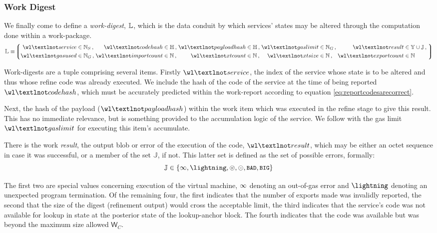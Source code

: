 \subsubsection{Work Digest}
We finally come to define a \emph{work-digest}, $\mathbb{L}$, which is the data conduit by which services' states may be altered through the computation done within a work-package.
\begin{equation}\label{eq:workdigest}
  \mathbb{L} \equiv \tuple{
    \begin{alignedat}{9}
      \isa{\wl¬service&}{\serviceid}\,,\;
      \isa{&\wl¬codehash&}{\hash}\,,\;
      \isa{&\wl¬payloadhash&}{\hash}\,,\;
      \isa{&\wl¬gaslimit&}{\gas}\,,\;
      \isa{&\wl¬result&}{\blob \cup \mathbb{J}}\,,\;\\
      \isa{\wl¬gasused&}{\gas}\,,\; %
      \isa{&\wl¬importcount&}{\N}\,,\; %
      \isa{&\wl¬xtcount&}{\N}\,,\; %
      \isa{&\wl¬xtsize&}{\N}\,,\; %
      \isa{&\wl¬exportcount&}{\N} %
    \end{alignedat}
  }
\end{equation}

Work-digests are a tuple comprising several items. Firstly $\wl¬service$, the index of the service whose state is to be altered and thus whose refine code was already executed. We include the hash of the code of the service at the time of being reported $\wl¬codehash$, which must be accurately predicted within the work-report according to equation \ref{eq:reportcodesarecorrect}.

Next, the hash of the payload ($\wl¬payloadhash$) within the work item which was executed in the refine stage to give this result. This has no immediate relevance, but is something provided to the accumulation logic of the service. We follow with the gas limit $\wl¬gaslimit$ for executing this item's accumulate.

There is the work \emph{result}, the output blob or error of the execution of the code, $\wl¬result$, which may be either an octet sequence in case it was successful, or a member of the set $\mathbb{J}$, if not. This latter set is defined as the set of possible errors, formally:
\begin{equation}
  \mathbb{J} \in \{ \oog, \panic, \badexports, \oversize, \token{BAD}, \token{BIG} \}
\end{equation}

The first two are special values concerning execution of the virtual machine, $\infty$ denoting an out-of-gas error and $\panic$ denoting an unexpected program termination. Of the remaining four, the first indicates that the number of exports made was invalidly reported, the second that the size of the digest (refinement output) would cross the acceptable limit, the third indicates that the service's code was not available for lookup in state at the posterior state of the lookup-anchor block. The fourth indicates that the code was available but was beyond the maximum size allowed $\mathsf{W}_C$.

